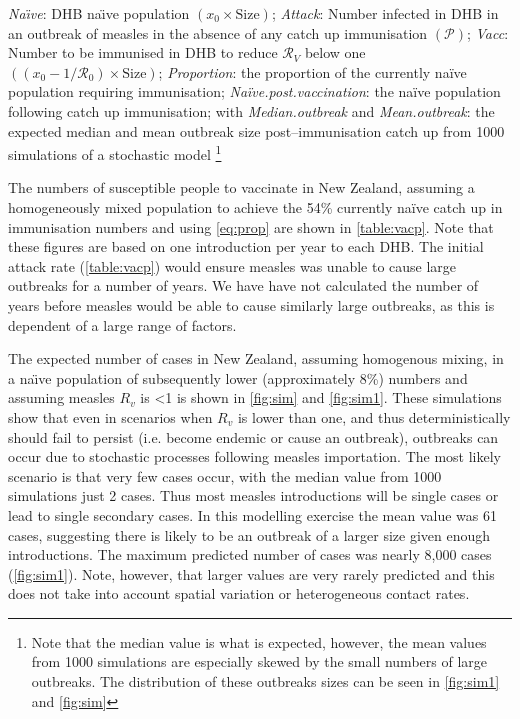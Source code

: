 \documentclass{article}
\newcommand{\Pe}{\mathcal{P}}
\newcommand{\Ro}{\mathcal{R}_0}
\newcommand{\Rr}{\mathcal{R}}
\begin{document}
\begin{table}
{\textit{Na\"{\i}ve}:	DHB na\"{\i}ve population $\left(x_0\times\text{Size}\right)$;		
\textit{Attack}: Number infected in DHB in an outbreak of measles in the absence of any catch up immunisation $\left(\Pe\right)$;
\textit{Vacc}: Number to be immunised in DHB to reduce $\Rr_V$ below one  $\left(\left(x_0-1/\Ro\right)\times\text{Size}\right)$; \textit{Proportion}: the proportion of the currently na\"{i}ve population requiring immunisation; \textit{Na\"{i}ve.post.vaccination}: the na\"{i}ve population following catch up immunisation; with \textit{Median.outbreak} and \textit{Mean.outbreak}: the expected median and mean outbreak size post--immunisation catch up from 1000 simulations of a stochastic model}
\footnote{Note that the median value is what is expected, however, the mean values from 1000 simulations are especially skewed by the small numbers of large outbreaks. The distribution of these outbreaks sizes can be seen in \autoref{fig:sim1} and \autoref{fig:sim}}
\label{table:vacp}
\end{table}

The numbers of susceptible people to vaccinate in New Zealand, assuming a homogeneously mixed population to achieve the 54\% currently na\"{i}ve catch up in immunisation numbers and using \autoref{eq:prop} are shown in \autoref{table:vacp}. Note that these figures are based on one introduction per year to each DHB. The initial attack rate (\autoref{table:vacp}) would ensure measles was unable to cause large outbreaks for a number of years. We have have not calculated the number of years before measles would be able to cause similarly large outbreaks, as this is dependent of a large range of factors.

The expected number of cases in New Zealand, assuming homogenous mixing, in a na\"{\i}ve population of subsequently lower (approximately 8\%) numbers and assuming measles $R_v$ is <1 is shown in \autoref{fig:sim} and \autoref{fig:sim1}. These simulations show that even in scenarios when $R_v$ is lower than one, and thus deterministically should fail to persist (i.e. become endemic or cause an outbreak), outbreaks can occur due to stochastic processes following measles importation. The most likely scenario is that very few cases occur, with the median value from 1000 simulations just 2 cases. Thus most measles introductions will be single cases or lead to single secondary cases. In this modelling exercise the mean value was 61 cases, suggesting there is likely to be an outbreak of a larger size given enough introductions. The maximum predicted number of cases was nearly 8,000 cases (\autoref{fig:sim1}). Note, however, that larger values are very rarely predicted and this does not take into account spatial variation or heterogeneous contact rates.
\end{document}
